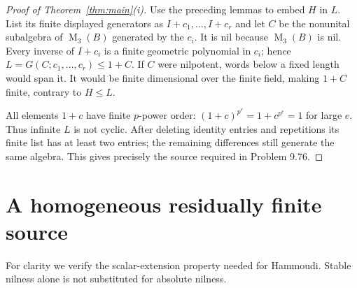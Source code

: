 \documentclass[11pt]{article}
\theoremstyle{definition}
\newcommand{\Mat}{\operatorname{M}}
\begin{document}
\begin{proof}[Proof of Theorem~\ref{thm:main}(i)]
Use the preceding lemmas to embed \(H\) in \(L\).
List its finite displayed generators as \(I+c_1,\ldots,I+c_r\) and let
\(C\) be the nonunital subalgebra of \(\Mat_3(B)\) generated by the \(c_i\).
It is nil because \(\Mat_3(B)\) is nil.
Every inverse of \(I+c_i\) is a finite geometric polynomial in \(c_i\);
hence \(L=G(C;c_1,\ldots,c_r)\leq1+C\).
If \(C\) were nilpotent, words below a fixed length would span it.
It would be finite dimensional over the finite field, making \(1+C\)
finite, contrary to \(H\leq L\).

All elements \(1+c\) have finite \(p\)-power order:
\((1+c)^{p^e}=1+c^{p^e}=1\) for large \(e\).
Thus infinite \(L\) is not cyclic. After deleting identity entries and
repetitions its finite list has at least two entries; the remaining
differences still generate the same algebra. This gives precisely the
source required in Problem 9.76.
\end{proof}

\section{A homogeneous residually finite source}

For clarity we verify the scalar-extension property needed for Hammoudi.
Stable nilness alone is not substituted for absolute nilness.
\end{document}
